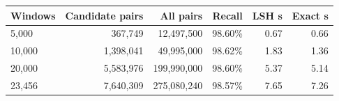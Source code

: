 \begin{tabular}{lrrrrr}
\toprule
Windows & Candidate pairs & All pairs & Recall & LSH s & Exact s \\
\midrule
5,000 & 367,749 & 12,497,500 & 98.60\% & 0.67 & 0.66 \\
10,000 & 1,398,041 & 49,995,000 & 98.62\% & 1.83 & 1.36 \\
20,000 & 5,583,976 & 199,990,000 & 98.60\% & 5.37 & 5.14 \\
23,456 & 7,640,309 & 275,080,240 & 98.57\% & 7.65 & 7.26 \\
\bottomrule
\end{tabular}
